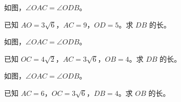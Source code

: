 \documentclass{exam-zh}
\begin{document}

\begin{problem}[points=10]
  \noindent
  \begin{minipage}[t]{\dimexpr\linewidth-60mm-6mm\relax}
    \vspace{0pt}
    如图，$\angle OAC=\angle ODB$。

已知 $AO=3\sqrt{6}$，$AC=9$，$OD=5$。求 $DB$ 的长。
    
  \end{minipage}\hfill
  \begin{diagramcoltikz}{60mm}{}
  }
  \end{diagramcoltikz}
  \par\medskip
  \answerarea[54mm]
\end{problem}



\begin{problem}[points=10]
  \noindent
  \begin{minipage}[t]{\dimexpr\linewidth-60mm-6mm\relax}
    \vspace{0pt}
    如图，$\angle OAC=\angle ODB$。

已知 $OC=4\sqrt{2}$，$AC=3\sqrt{6}$，$OB=4$。求 $DB$ 的长。
    
  \end{minipage}\hfill
  \begin{diagramcoltikz}{60mm}{}
  }
  \end{diagramcoltikz}
  \par\medskip
  \answerarea[54mm]
\end{problem}



\begin{problem}[points=10]
  \noindent
  \begin{minipage}[t]{\dimexpr\linewidth-60mm-6mm\relax}
    \vspace{0pt}
    如图，$\angle OAC=\angle ODB$。

已知 $AC=6$，$OC=3\sqrt{6}$，$DB=4$。求 $OB$ 的长。
    
  \end{minipage}\hfill
  \begin{diagramcoltikz}{60mm}{}
  }
  \end{diagramcoltikz}
  \par\medskip
  \answerarea[54mm]
\end{problem}
\end{document}
